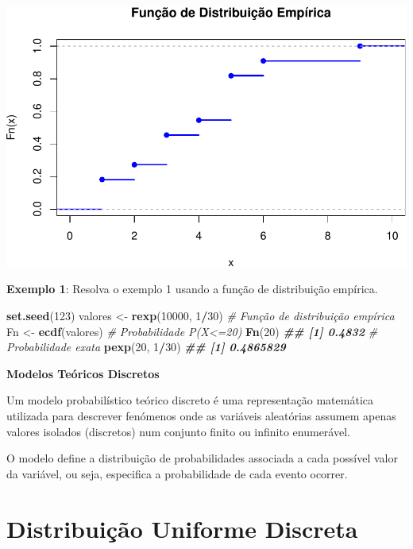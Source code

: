 \documentclass[
]{book}
\newenvironment{Shaded}{\begin{snugshade}}{\end{snugshade}}
\newcommand{\CommentTok}[1]{\textcolor[rgb]{0.56,0.35,0.01}{\textit{#1}}}
\newcommand{\DecValTok}[1]{\textcolor[rgb]{0.00,0.00,0.81}{#1}}
\newcommand{\DocumentationTok}[1]{\textcolor[rgb]{0.56,0.35,0.01}{\textbf{\textit{#1}}}}
\newcommand{\FunctionTok}[1]{\textcolor[rgb]{0.13,0.29,0.53}{\textbf{#1}}}
\newcommand{\NormalTok}[1]{#1}
\newcommand{\OtherTok}[1]{\textcolor[rgb]{0.56,0.35,0.01}{#1}}
\newcommand{\SpecialCharTok}[1]{\textcolor[rgb]{0.81,0.36,0.00}{\textbf{#1}}}
\begin{document}
\includegraphics{introR_files/figure-latex/unnamed-chunk-252-1.pdf}

\textbf{Exemplo 1}: Resolva o exemplo 1 usando a função de distribuição
empírica.

\begin{Shaded}
\begin{Highlighting}[]
\FunctionTok{set.seed}\NormalTok{(}\DecValTok{123}\NormalTok{)}
\NormalTok{valores }\OtherTok{\textless{}{-}} \FunctionTok{rexp}\NormalTok{(}\DecValTok{10000}\NormalTok{, }\DecValTok{1}\SpecialCharTok{/}\DecValTok{30}\NormalTok{)}
\CommentTok{\# Função de distribuição empírica}
\NormalTok{Fn }\OtherTok{\textless{}{-}} \FunctionTok{ecdf}\NormalTok{(valores)}
\CommentTok{\# Probabilidade P(X\textless{}=20)}
\FunctionTok{Fn}\NormalTok{(}\DecValTok{20}\NormalTok{)}
\DocumentationTok{\#\# [1] 0.4832}
\CommentTok{\# Probabilidade exata}
\FunctionTok{pexp}\NormalTok{(}\DecValTok{20}\NormalTok{, }\DecValTok{1}\SpecialCharTok{/}\DecValTok{30}\NormalTok{)}
\DocumentationTok{\#\# [1] 0.4865829}
\end{Highlighting}
\end{Shaded}

\textbf{Modelos Teóricos Discretos}

Um modelo probabilístico teórico discreto é uma representação matemática utilizada para descrever fenómenos onde as variáveis aleatórias assumem apenas valores isolados (discretos) num conjunto finito ou infinito enumerável.

O modelo define a distribuição de probabilidades associada a cada possível valor da variável, ou seja, especifica a probabilidade de cada evento ocorrer.

\section{Distribuição Uniforme Discreta}\label{distribuiuxe7uxe3o-uniforme-discreta}
\end{document}
